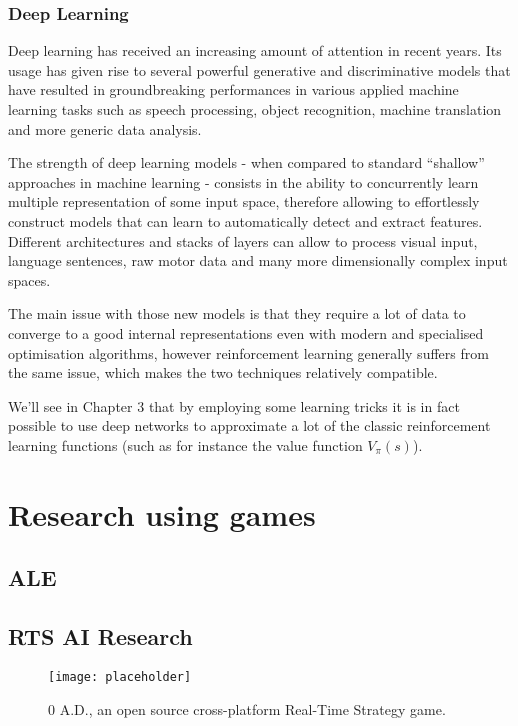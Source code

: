 \subsubsection{Deep Learning}

Deep learning has received an increasing amount of attention in recent years.
Its usage has given rise to several powerful generative and discriminative
models that have resulted in groundbreaking performances in various applied
machine learning tasks such as speech processing, object recognition, machine
translation and more generic data analysis.

The strength of deep learning models - when compared to standard ``shallow''
approaches in machine learning - consists in the ability to concurrently learn
multiple representation of some input space, therefore allowing to effortlessly
construct models that can learn to automatically detect and extract features.
Different architectures and stacks of layers can allow to process visual input,
language sentences, raw motor data and many more dimensionally complex input
spaces.

The main issue with those new models is that they require a lot of data to
converge to a good internal representations even with modern and specialised
optimisation algorithms, however reinforcement learning generally suffers from
the same issue, which makes the two techniques relatively compatible.

We'll see in Chapter 3 that by employing some learning tricks it is in fact possible
to use deep networks to approximate a lot of the classic reinforcement learning
functions (such as for instance the value function $V_{\pi}(s)$).

\section{Research using games}

\subsection{ALE}

\subsection{RTS AI Research}

\begin{figure}[h]
    \centering
    \texttt{[image: placeholder]}
    \caption{0 A.D., an open source cross-platform Real-Time Strategy game.}
    \label{fig:ALE}
\end{figure}



